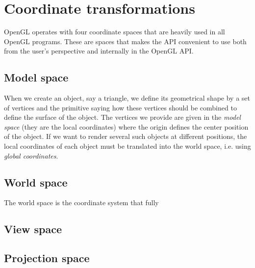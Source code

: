 \section{Coordinate transformations}
\label{sec:opengl_coordinate_transformations}
OpenGL operates with four coordinate spaces that are heavily used in all OpenGL programs. These are spaces that makes the API convenient to use both from the user's perspective and internally in the OpenGL API. 
\subsection{Model space}
When we create an object, say a triangle, we define its geometrical shape by a set of vertices and the primitive saying how these vertices should be combined to define the surface of the object. The vertices we provide are given in the \textit{model space} (they are the local coordinates) where the origin defines the center position of the object. If we want to render several such objects at different positions, the local coordinates of each object must be translated into the world space, i.e. using \textit{global coordinates}.
\subsection{World space}
The world space is the coordinate system that fully 

\subsection{View space}

\subsection{Projection space}